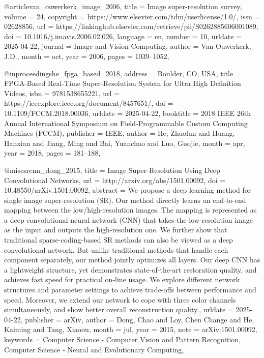 {@article{van_ouwerkerk_image_2006,
	title = {Image super-resolution survey},
	volume = {24},
	copyright = {https://www.elsevier.com/tdm/userlicense/1.0/},
	issn = {02628856},
	url = {https://linkinghub.elsevier.com/retrieve/pii/S0262885606001089},
	doi = {10.1016/j.imavis.2006.02.026},
	language = {en},
	number = {10},
	urldate = {2025-04-22},
	journal = {Image and Vision Computing},
	author = {Van Ouwerkerk, J.D.},
	month = oct,
	year = {2006},
	pages = {1039--1052},
}

@inproceedings{he_fpga_based_2018,
	address = {Boulder, CO, USA},
	title = {{FPGA}-{Based} {Real}-{Time} {Super}-{Resolution} {System} for {Ultra} {High} {Definition} {Videos}},
	isbn = {9781538655221},
	url = {https://ieeexplore.ieee.org/document/8457651/},
	doi = {10.1109/FCCM.2018.00036},
	urldate = {2025-04-22},
	booktitle = {2018 {IEEE} 26th {Annual} {International} {Symposium} on {Field}-{Programmable} {Custom} {Computing} {Machines} ({FCCM})},
	publisher = {IEEE},
	author = {He, Zhuolun and Huang, Hanxian and Jiang, Ming and Bai, Yuanchao and Luo, Guojie},
	month = apr,
	year = {2018},
	pages = {181--188},
}

@misc{srcnn_dong_2015,
	title = {Image {Super}-{Resolution} {Using} {Deep} {Convolutional} {Networks}},
	url = {http://arxiv.org/abs/1501.00092},
	doi = {10.48550/arXiv.1501.00092},
	abstract = {We propose a deep learning method for single image super-resolution (SR). Our method directly learns an end-to-end mapping between the low/high-resolution images. The mapping is represented as a deep convolutional neural network (CNN) that takes the low-resolution image as the input and outputs the high-resolution one. We further show that traditional sparse-coding-based SR methods can also be viewed as a deep convolutional network. But unlike traditional methods that handle each component separately, our method jointly optimizes all layers. Our deep CNN has a lightweight structure, yet demonstrates state-of-the-art restoration quality, and achieves fast speed for practical on-line usage. We explore different network structures and parameter settings to achieve trade-offs between performance and speed. Moreover, we extend our network to cope with three color channels simultaneously, and show better overall reconstruction quality.},
	urldate = {2025-04-22},
	publisher = {arXiv},
	author = {Dong, Chao and Loy, Chen Change and He, Kaiming and Tang, Xiaoou},
	month = jul,
	year = {2015},
	note = {arXiv:1501.00092},
	keywords = {Computer Science - Computer Vision and Pattern Recognition, Computer Science - Neural and Evolutionary Computing},
}

}
